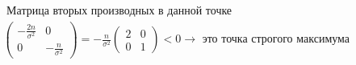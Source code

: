 \documentclass[a4paper,12pt]{article} %
\begin{document}
\begin{example}
$$
\begin{aligned}
&\text { Матрица вторых производных в данной точке }\\
&\left(\begin{array}{cc}
	-\frac{2 n}{\sigma^{2}} & 0 \\
	0 & -\frac{n}{\sigma^{2}}
\end{array}\right)=-\frac{n}{\sigma^{2}}\left(\begin{array}{cc}
	2 & 0 \\
	0 & 1
\end{array}\right)<0 \rightarrow \text { это точка строгого максимума }
\end{aligned}
$$






\end{example}
\end{document}
